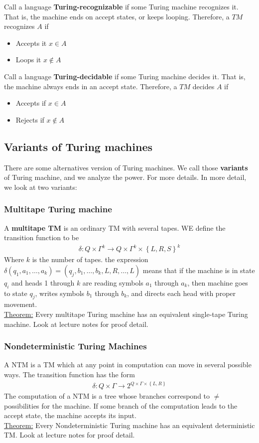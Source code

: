 \documentclass[a4paper]{article}
\begin{document}
Call a language {\bf Turing-recognizable} if some Turing machine recognizes it. That is, the machine ends on accept states, or keeps looping. Therefore, a $TM$ recognizes $A$ if
\begin{itemize}
  \item Accepts it $x \in A$
  \item Loops it $x \notin A$
\end{itemize}
Call a language {\bf Turing-decidable} if some Turing machine decides it. That is, the machine always ends in an accept state. Therefore, a $TM$ decides $A$ if
\begin{itemize}
  \item Accepts if $x \in A$
  \item Rejects if $x \notin A$
\end{itemize}
\subsection{Variants of Turing machines} %
\label{sub:Variants of TUring machines}
There are some alternatives version of Turing machines. We call those {\bf variants} of Turing machine, and we analyze the power. For more details. In more detail, we look at two variants:
\subsubsection{Multitape Turing machine}
A {\bf multitape TM} is an ordinary TM with several tapes. WE define the transition function to be
\begin{align}
  \delta:Q\times\Gamma^k\rightarrow Q\times\Gamma^k\times\left\{ L,R,S \right\}^k
\end{align}
Where $k$ is the number of tapes. the expression $\delta(q_1,a_1,\dots,a_k)=\left( q_j,b_1,\dots,b_k,L,R,\dots,L \right)$ means that if the machine is in state $q_i$ and heads 1 through $k$ are reading symbols $a_1$ through $a_k$, then machine goes to state $q_j$, writes symbols $b_1$ through $b_k$, and directs each head with proper movement. \\
\underline{Theorem:} Every multitape Turing machine has an equivalent single-tape Turing machine. Look at lecture notes for proof detail.
\subsubsection{Nondeterministic Turing Machines}
A NTM is a TM which at any point in computation can move in several possible ways. The transition function has the form
\begin{align}
  \delta:Q\times\Gamma\rightarrow2^{Q\times\Gamma\times\left\{ L,R \right\}}
\end{align}
The computation of a NTM is a tree whose branches correspond to $\neq$ possibilities for the machine. If some branch of the computation leads to the accept state, the machine accepts its input. \\
\underline{Theorem:} Every Nondeterministic Turing machine has an equivalent deterministic TM. Look at lecture notes for proof detail. 
\end{document}
